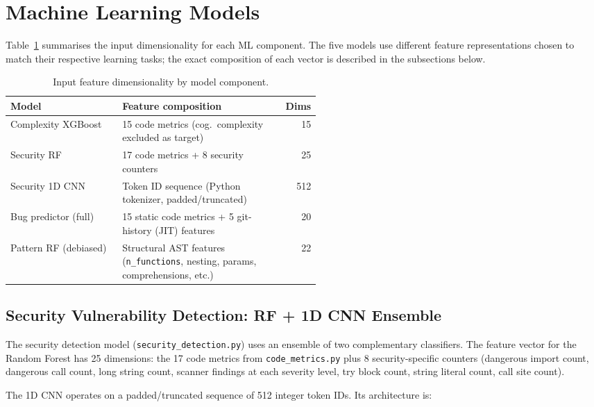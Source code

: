 \documentclass[12pt, oneside]{report}
\begin{document}
\section{Machine Learning Models}
\label{sec:models}

Table~\ref{tab:feature-dims} summarises the input dimensionality for each ML component.
The five models use different feature representations chosen to match their respective
learning tasks; the exact composition of each vector is described in the subsections below.

\begin{table}[h]
\centering
\caption{Input feature dimensionality by model component.}
\label{tab:feature-dims}
\begin{tabular}{lp{0.52\linewidth}r}
\toprule
\textbf{Model} & \textbf{Feature composition} & \textbf{Dims} \\
\midrule
Complexity XGBoost   & 15 code metrics (cog.\ complexity excluded as target)       & 15 \\
Security RF          & 17 code metrics + 8 security counters                      & 25 \\
Security 1D CNN      & Token ID sequence (Python tokenizer, padded/truncated)      & 512 \\
Bug predictor (full) & 15 static code metrics + 5 git-history (JIT) features      & 20 \\
Pattern RF (debiased) & Structural AST features (\texttt{n\_functions}, nesting, params, comprehensions, etc.) & 22 \\
\bottomrule
\end{tabular}
\end{table}

\subsection{Security Vulnerability Detection: RF + 1D CNN Ensemble}
\label{ssec:security}

The security detection model (\texttt{security\_detection.py}) uses an ensemble of two
complementary classifiers. The feature vector for the Random Forest has 25 dimensions:
the 17 code metrics from \texttt{code\_metrics.py} plus 8 security-specific counters
(dangerous import count, dangerous call count, long string count, scanner findings at
each severity level, try block count, string literal count, call site count).

The 1D CNN operates on a padded/truncated sequence of 512 integer token IDs. Its
architecture is:
\end{document}

